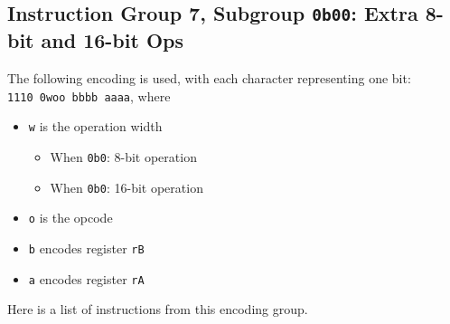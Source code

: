 \documentclass{article}
\begin{document}
	\subsection{Instruction Group 7, Subgroup \texttt{0b00}:
		Extra 8-bit and 16-bit Ops}
	The following encoding is used, with each character representing one
	bit: \\
	\texttt{1110 0woo bbbb aaaa}, where

	\singlespacing
	\begin{itemize}
	\item \texttt{w} is the operation width
		\begin{itemize}
		\item When \texttt{0b0}:
			8-bit operation
		\item When \texttt{0b0}:
			16-bit operation
		\end{itemize}
	\item \texttt{o} is the opcode
	\item \texttt{b} encodes register \texttt{rB}
	\item \texttt{a} encodes register \texttt{rA}
	\end{itemize}
	\doublespacing

	Here is a list of instructions from this encoding group.
\end{document}
